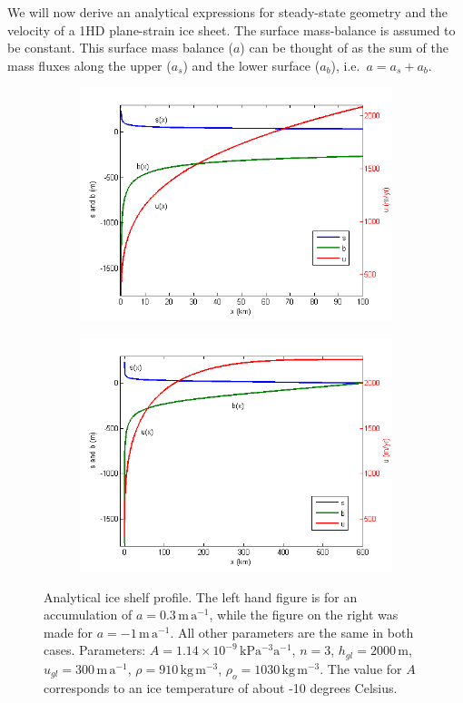 \documentclass[10pt,a4paper]{book}
\begin{document}
We will now derive an analytical expressions for steady-state geometry
and the velocity of a 1HD plane-strain ice sheet. The surface
mass-balance is assumed to be constant. This surface mass balance
($a$) can be thought of as the sum of the mass fluxes along the upper
($a_s$) and the lower surface ($a_b$), i.e.\ $a=a_s+a_b$.

\begin{figure}
\begin{subfigure}{0.5\textwidth}
\centering
\includegraphics[width=\textwidth]{IceShelfProfile.png}
\end{subfigure}
\begin{subfigure}{0.5\textwidth}
\centering
\includegraphics[width=\textwidth]{IceShelfProfileFiniteLength.png}
\end{subfigure}
\caption{\label{fig:alp}Analytical ice shelf profile.  The left hand figure is for an
  accumulation of $a=0.3\,\mathrm{m\,a^{-1}}$, while the figure on the
  right was made for $a=-1\,\mathrm{m\,a^{-1}}$. All other parameters
  are the same in both cases. Parameters: $A=1.14 \times
  10^{-9}\,\mathrm{kPa^{-3} a^{-1}}$, $n=3$, $h_{gl}=2000\,\mathrm{m}$,
  $u_{gl}=300\,\mathrm{m\,a^{-1}}$, $\rho=910 \, \mathrm{kg \,
    m^{-3}}$, $\rho_o=1030 \, \mathrm{kg \, m^{-3}}$. The value for
  $A$ corresponds to an ice temperature of about -10 degrees Celsius.}
\end{figure}
\end{document}

